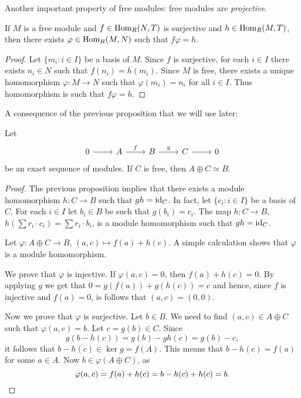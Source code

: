 Another important property of free modules: free modules are
\emph{projective}. 

\begin{proposition}
	\label{pro:free=>projective}
	If $M$ is a free module and $f\in\operatorname{Hom}_R(N,T)$ is surjective and
	$h\in\operatorname{Hom}_R(M,T)$, then there exists $\varphi\in\operatorname{Hom}_R(M,N)$ such that
	$f\varphi=h$. 
\end{proposition}

\begin{proof}
	Let $\{m_i:i\in I\}$ be a basis of $M$. Since $f$ is surjective, for each
	$i\in I$ there exists $n_i\in N$ such that $f(n_i)=h(m_i)$. Since  $M$ is
	free, there exists a unique homomorphism $\varphi\colon M\to N$ such that
	$\varphi(m_i)=n_i$ for all $i\in I$. Thus homomorphism is such that
	$f\varphi=h$. 
\end{proof}

A consequence of the previous proposition
that we will use later:

\begin{proposition}
\label{pro:split}
	Let 
	\[
	   \begin{tikzcd}
        0 & A & B & C & 0
        \arrow[from=1-1, to=1-2]
        \arrow["f", from=1-2, to=1-3]
        \arrow["g", from=1-3, to=1-4]
        \arrow[from=1-4, to=1-5]
    \end{tikzcd}
	\]
	be an exact sequence of modules.  If $C$ is free, then $A\oplus C\simeq B$. 
\end{proposition}

\begin{proof}
	The previous proposition 
	implies that there exists a module homomorphism $h\colon C\to B$
	such that $gh=\operatorname{id}_C$. In fact, let $\{c_i:i\in I\}$ be a basis of $C$.
	For each $i\in I$ let $b_i\in B$ be such that $g(b_i)=c_i$. The map 
	$h\colon C\to B$, $h(\sum r_i\cdot c_i)=\sum r_i\cdot b_i$, is a module homomorphism 
	such that $gh=\operatorname{id}_C$. 

	Let $\varphi\colon A\oplus C\to B$, $(a,c)\mapsto f(a)+h(c)$. A simple
	calculation shows that $\varphi$ is a module homomorphism. 

	We prove that $\varphi$ is 
	injective. If $\varphi(a,c)=0$, then $f(a)+h(c)=0$. By applying $g$ we get that
	$0=g(f(a))+g(h(c))=c$ and hence, since $f$ is injective and
	$f(a)=0$, is follows that $(a,c)=(0,0)$. 
		
	Now we prove that $\varphi$ is surjective. 
	Let $b\in B$. 
	We need to find $(a,c)\in A\oplus C$ such that $\varphi(a,c)=b$. 
	Let $c=g(b)\in C$. Since
	\[
		g(b-h(c))=g(b)-gh(c)=g(b)-c,
	\]
	it follows that $b-h(c)\in \ker g=f(A)$. This means
	that $b-h(c)=f(a)$ for some $a\in A$. Now $b\in \varphi(A\oplus C)$, as
	\[
		\varphi(a,c)=f(a)+h(c)=b-h(c)+h(c)=b.\qedhere
	\]
\end{proof}

